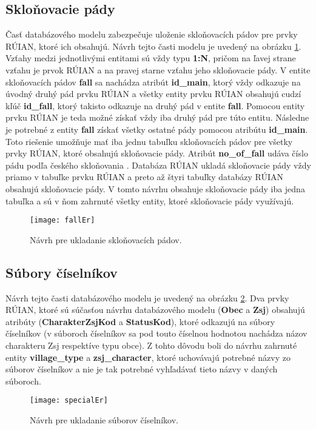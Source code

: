 \subsection {Skloňovacie pády}
Časť databázového modelu zabezpečuje uloženie skloňovacích pádov pre prvky RÚIAN, ktoré ich obsahujú. Návrh tejto časti modelu je uvedený na obrázku \ref{fallEr}. Vzťahy medzi jednotlivými entitami sú vždy typu {\bf 1:N}, pričom na ľavej strane vzťahu je prvok RÚIAN a na pravej starne vzťahu jeho skloňovacie pády. V entite skloňovacích pádov {\bf fall} sa nachádza atribút {\bf id\_main}, ktorý vždy odkazuje na úvodný druhý pád prvku RÚIAN a všetky entity prvku RÚIAN obsahujú cudzí kľúč {\bf id\_fall}, ktorý takisto odkazuje na druhý pád v entite {\bf fall}. Pomocou entity prvku RÚIAN je teda možné získať vždy iba druhý pád pre túto entitu. Následne je potrebné z entity {\bf fall} získať všetky ostatné pády pomocou atribútu {\bf id\_main}. Toto riešenie umožňuje mať iba jednu tabuľku skloňovacích pádov pre všetky prvky RÚIAN, ktoré obsahujú skloňovacie pády. Atribút {\bf no\_of\_fall} udáva číslo pádu podľa českého skloňovania \cite{czechFall}. Databáza RÚIAN ukladá skloňovacie pády vždy priamo v tabuľke prvku RÚIAN a preto až štyri tabuľky databázy RÚIAN obsahujú skloňovacie pády. V tomto návrhu obsahuje skloňovacie pády iba jedna tabuľka a sú v ňom zahrnuté všetky entity, ktoré skloňovacie pády využívajú. 
\begin{figure}[H]
\texttt{[image: fallEr]}
\centering
\caption{Návrh pre ukladanie skloňovacích pádov.}
\label{fallEr}
\end{figure}
\subsection {Súbory číselníkov}
Návrh tejto časti databázového modelu je uvedený na obrázku \ref{specialEr}.
Dva prvky RÚIAN, ktoré sú súčasťou návrhu databázového modelu ({\bf Obec} a {\bf Zsj}) obsahujú atribúty ({\bf CharakterZsjKod} a {\bf StatusKod}), ktoré odkazujú na súbory číselníkov (v súboroch číselníkov sa pod touto číselnou hodnotou nachádza názov charakteru Zsj respektíve typu obce). Z tohto dôvodu boli do návrhu zahrnuté entity {\bf village\_type} a {\bf zsj\_character}, ktoré uchovávajú potrebné názvy zo súborov číselníkov a nie je tak potrebné vyhľadávať tieto názvy v daných súboroch.
\begin{figure}[H]
\texttt{[image: specialEr]}
\centering
\caption{Návrh pre ukladanie súborov číselníkov.}
\label{specialEr}
\end{figure}
